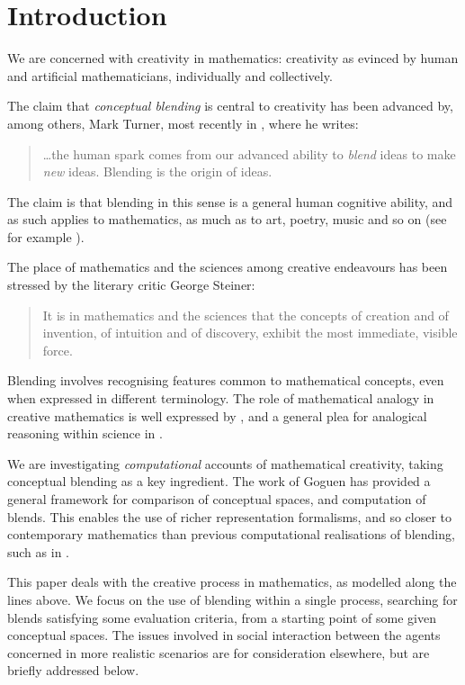 \section{Introduction}
\label{sec:intro}

We are concerned with creativity in mathematics: creativity
as evinced by human and artificial mathematicians,
individually and collectively.

The claim that \emph{conceptual blending} is central to creativity
has been advanced by, among others, Mark Turner, most recently
in \textcite{MTurner14}, where he writes:
\begin{quote}
  \dots the human spark comes from our advanced ability to \emph{blend} ideas
  to make \emph{new} ideas. Blending is the origin of ideas.%
  \hfill \parencite[p 2]{MTurner14}
\end{quote}
The claim is that blending in this sense is a general human cognitive
ability, and as such applies to mathematics, as much as to art, poetry,
music and so on (see for example \textcite{MTurner05}).

The place of mathematics and the sciences among creative endeavours
has been stressed by the literary critic George Steiner:
\begin{quote}
  It is in mathematics and the sciences that the concepts of
creation and of invention, of intuition and of discovery,
exhibit the most immediate, visible force.
\end{quote}
Blending involves recognising features common
to mathematical concepts, even when expressed in different
terminology.  The role of mathematical analogy in creative mathematics
is well expressed by \textcite{Weil60}, and a general plea for
analogical reasoning within science in \cite{ArbibHesse86}.

We are investigating \emph{computational} accounts of mathematical
creativity, taking conceptual blending as a key ingredient.  The work
of Goguen \parencite{Gog99,Gog05,Gog05b} has provided a general framework for
comparison of conceptual spaces, and computation of blends.  This
enables the use of richer representation formalisms, and so closer to
contemporary mathematics than previous computational realisations of
blending, such as in \textcite{Pereira2007}.

This paper deals with the creative process in mathematics, as modelled
along the lines above. We focus on the use of blending within a single
process, searching for blends satisfying some evaluation criteria,
from a starting point of some given conceptual spaces. The issues
involved in social interaction between the agents concerned in more
realistic scenarios are for consideration elsewhere, but are briefly
addressed below.

